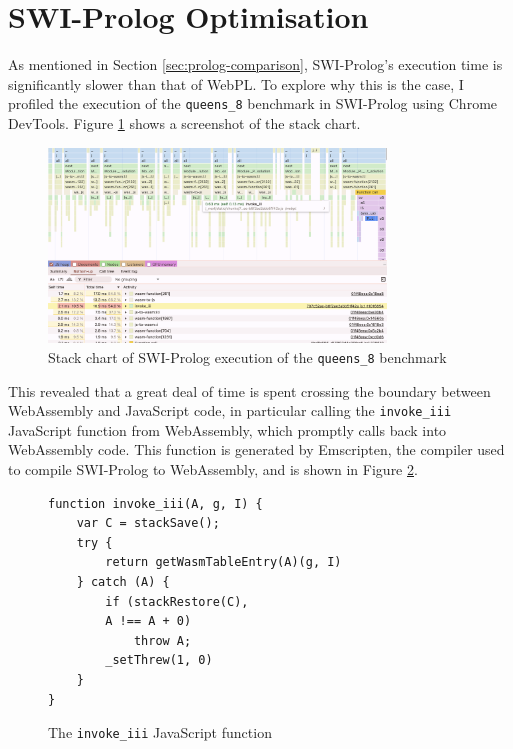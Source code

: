 \section{SWI-Prolog Optimisation}

\label{sec:swi-prolog-optimisation}

As mentioned in Section \ref{sec:prolog-comparison}, SWI-Prolog's execution time is significantly slower than that of WebPL. To explore why this is the case, I profiled the execution of the \texttt{queens\_8} benchmark in SWI-Prolog using Chrome DevTools. Figure \ref{fig:swi-prolog-profile} shows a screenshot of the stack chart.

\begin{figure}[H]
\centering
\includegraphics[width=0.8\textwidth]{08evaluation_swiprofiling.png}
\caption{Stack chart of SWI-Prolog execution of the \texttt{queens\_8} benchmark}
\label{fig:swi-prolog-profile}
\end{figure}

This revealed that a great deal of time is spent crossing the boundary between WebAssembly and JavaScript code, in particular calling the \texttt{invoke\_iii} JavaScript function from WebAssembly, which promptly calls back into WebAssembly code. This function is generated by Emscripten, the compiler used to compile SWI-Prolog to WebAssembly, and is shown in Figure \ref{fig:invoke-iii}.

\begin{figure}[H]
\centering
\begin{verbatim}
function invoke_iii(A, g, I) {
    var C = stackSave();
    try {
        return getWasmTableEntry(A)(g, I)
    } catch (A) {
        if (stackRestore(C),
        A !== A + 0)
            throw A;
        _setThrew(1, 0)
    }
}
\end{verbatim}
\caption{The \texttt{invoke\_iii} JavaScript function}
\label{fig:invoke-iii}
\end{figure}

